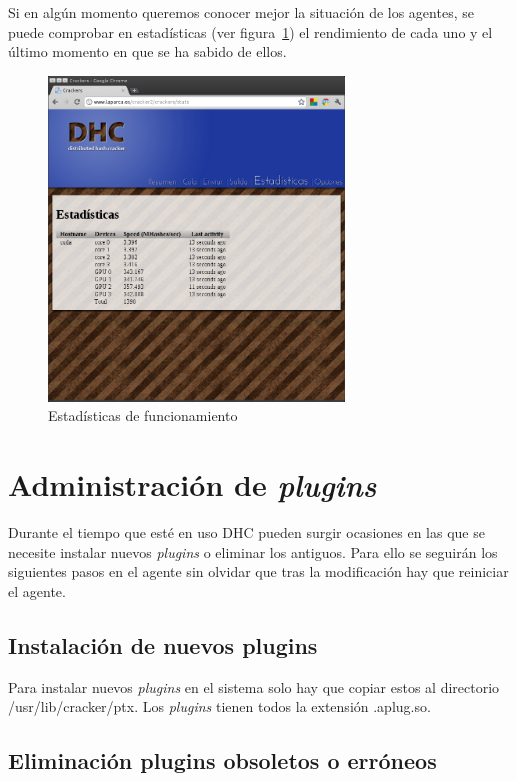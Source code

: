 Si en algún momento queremos conocer mejor la situación de los agentes, se puede comprobar en estadísticas (ver figura~\ref{fig:DHC_estadisticas}) el rendimiento de cada uno y el último momento en que se ha sabido de ellos.

\begin{figure}
	\centering
	\includegraphics[width=0.7\textwidth]{images/estadisticas.png}
	\caption{Estadísticas de funcionamiento}\label{fig:DHC_estadisticas}
\end{figure}

\section{Administración de \emph{plugins}}

Durante el tiempo que esté en uso DHC pueden surgir ocasiones en las que se necesite instalar nuevos \emph{plugins} o eliminar los antiguos.  Para ello se seguirán los siguientes pasos en el agente sin olvidar que tras la modificación hay que reiniciar el agente.

\subsection{Instalación de nuevos plugins}

Para instalar nuevos \emph{plugins} en el sistema solo hay que copiar estos al directorio /usr/lib/cracker/ptx. Los \emph{plugins} tienen todos la extensión .aplug.so.

\subsection{Eliminación plugins obsoletos o erróneos}

